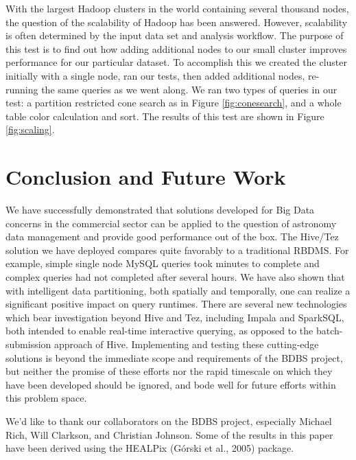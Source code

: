 \documentclass[11pt,twoside]{article}
\begin{document}

With the largest Hadoop clusters in the world containing several thousand nodes, the question of the
scalability of Hadoop has been answered. However, scalability is often determined by the input data set and
analysis workflow. The purpose of this test is to find out how adding additional nodes to our small cluster
improves performance for our particular dataset.  To accomplish this we created the cluster initially with a
single node, ran our tests, then added additional nodes, re-running the same queries as we went along.  We
ran two types of queries in our test: a partition restricted cone search as in Figure  \ref{fig:conesearch}, and a
whole table color calculation and sort.  The results of this test are shown in Figure \ref{fig:scaling}.

\section{Conclusion and Future Work}

We have successfully demonstrated that solutions developed for Big Data concerns in the commercial sector can
be applied to the question of astronomy data management and provide good performance out of the box. The
Hive/Tez solution we have deployed compares quite favorably to a traditional RBDMS. For example, simple single
node MySQL queries took minutes to complete and complex queries had not completed after several hours.  We
have also shown that with intelligent data partitioning, both spatially and temporally, one can realize a
significant positive impact on query runtimes. There are several new technologies which bear investigation beyond Hive and Tez, including Impala and
SparkSQL, both intended to enable real-time interactive querying, as opposed to the batch-submission approach
of Hive.  Implementing and testing these cutting-edge solutions is beyond the immediate scope and requirements
of the BDBS project, but neither the promise of these efforts nor the rapid timescale on which they have been
developed should be ignored, and bode well for future efforts within this problem space.

\acknowledgements We'd like to thank our collaborators on the BDBS project, especially Michael Rich, Will
Clarkson, and Christian Johnson. Some of the results in this paper have been derived using the HEALPix (Górski et al., 2005) package.


\end{document}
